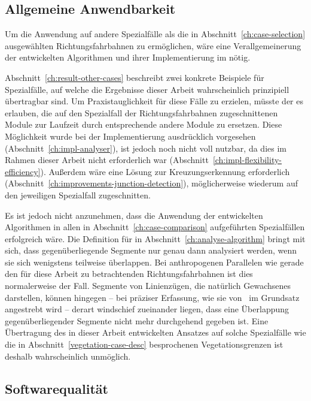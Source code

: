 \documentclass[../main/thesis.tex]{subfiles}
\begin{document}
\subsection{Allgemeine Anwendbarkeit}

Um die Anwendung auf andere Spezialfälle als die in Abschnitt~\ref{ch:case-selection} ausgewählten Richtungsfahrbahnen zu ermöglichen, wäre eine Verallgemeinerung der entwickelten Algorithmen und ihrer Implementierung im  nötig.

Abschnitt~\ref{ch:result-other-cases} beschreibt zwei konkrete Beispiele für Spezialfälle, auf welche die Ergebnisse dieser Arbeit wahrscheinlich prinzipiell übertragbar sind.
Um Praxistauglichkeit für diese Fälle zu erzielen, müsste der  es erlauben, die auf den Spezialfall der Richtungsfahrbahnen zugeschnittenen Module zur Laufzeit durch entsprechende andere Module zu ersetzen.
Diese Möglichkeit wurde bei der Implementierung ausdrücklich vorgesehen (Abschnitt~\ref{ch:impl-analyser}), ist jedoch noch nicht voll nutzbar, da dies im Rahmen dieser Arbeit nicht erforderlich war (Abschnitt~\ref{ch:impl-flexibility-efficiency}).
Außerdem wäre eine Lösung zur Kreuzungserkennung erforderlich (Abschnitt~\ref{ch:improvements-junction-detection}), möglicherweise wiederum auf den jeweiligen Spezialfall zugeschnitten.

Es ist jedoch nicht anzunehmen, dass die Anwendung der entwickelten Algorithmen in allen in Abschnitt~\ref{ch:case-comparison} aufgeführten Spezialfällen erfolgreich wäre.
Die Definition für  in Abschnitt~\ref{ch:analyse-algorithm} bringt mit sich, dass gegenüberliegende Segmente nur genau dann analysiert werden, wenn sie sich wenigstens teilweise überlappen.
Bei anthropogenen Parallelen wie gerade den für diese Arbeit zu betrachtenden Richtungsfahrbahnen ist dies normalerweise der Fall.
Segmente von Linienzügen, die natürlich Gewachsenes darstellen, können hingegen -- bei präziser Erfassung, wie sie von \osm\ im Grundsatz angestrebt wird -- derart windschief zueinander liegen, dass eine Überlappung gegenüberliegender Segmente nicht mehr durchgehend gegeben ist.
Eine Übertragung des in dieser Arbeit entwickelten Ansatzes auf solche Spezialfälle wie die in Abschnitt~\ref{vegetation-case-desc} besprochenen Vegetationsgrenzen ist deshalb wahrscheinlich unmöglich.




\subsection{Softwarequalität}
\label{ch:improvements-software}
\end{document}
